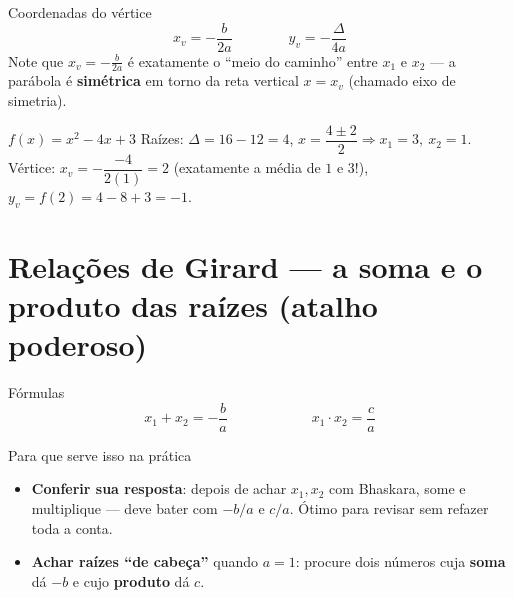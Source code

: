 \documentclass[12pt,a4paper]{article}
\begin{document}
\begin{definicao}{Coordenadas do vértice}
\[
x_v = -\frac{b}{2a} \qquad\qquad y_v = -\frac{\Delta}{4a}
\]
Note que $x_v=-\frac{b}{2a}$ é exatamente o ``meio do caminho'' entre
$x_1$ e $x_2$ — a parábola é \textbf{simétrica} em torno da reta vertical
$x=x_v$ (chamado eixo de simetria).
\end{definicao}

\begin{exemplo}{$f(x)=x^2-4x+3$}
Raízes: $\Delta=16-12=4$, $x=\dfrac{4\pm2}{2} \Rightarrow x_1=3,\ x_2=1$.
Vértice: $x_v=-\dfrac{-4}{2(1)}=2$ (exatamente a média de $1$ e $3$!),
$y_v = f(2) = 4-8+3=-1$.
\begin{center}
\end{center}
\end{exemplo}

\section{Relações de Girard — a soma e o produto das raízes (atalho poderoso)}

\begin{definicao}{Fórmulas}
\[
x_1+x_2 = -\frac{b}{a} \qquad\qquad\qquad x_1\cdot x_2 = \frac{c}{a}
\]
\end{definicao}

\begin{dica}{Para que serve isso na prática}
\begin{itemize}[nosep]
  \item \textbf{Conferir sua resposta}: depois de achar $x_1,x_2$ com
  Bhaskara, some e multiplique — deve bater com $-b/a$ e $c/a$. Ótimo para
  revisar sem refazer toda a conta.
  \item \textbf{Achar raízes ``de cabeça''} quando $a=1$: procure dois
  números cuja \textbf{soma} dá $-b$ e cujo \textbf{produto} dá $c$.
\end{itemize}
\end{dica}
\end{document}
